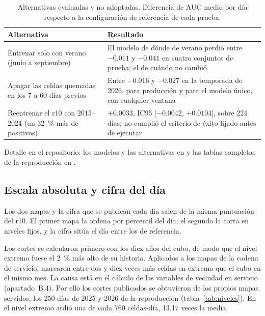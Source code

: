 \documentclass[10pt,a4paper]{article}
\begin{document}
\begin{table}[H]
  \centering
  \caption{Alternativas evaluadas y no adoptadas. Diferencia de AUC medio por
  día respecto a la configuración de referencia de cada prueba.}
  \label{tab:descartes}
  \footnotesize
  \begin{tabular}{@{}>{\raggedright}p{5.2cm}>{\raggedright\arraybackslash}p{11cm}@{}}
    \toprule
    Alternativa & Resultado \\
    \midrule
    Entrenar solo con verano (junio a septiembre) & El modelo de dónde de verano perdió entre $-0.011$ y $-0.041$ en cuatro conjuntos de prueba; el de cuándo no cambió \\
    Apagar las celdas quemadas en los 7 a 60 días previos & Entre $-0.016$ y $-0.027$ en la temporada de 2026, para producción y para el modelo único, con cualquier ventana \\
    Reentrenar el r10 con 2015--2024 (un 32~\% más de positivos) & $+0.0033$, IC95 [$-0.0042$, $+0.0104$], sobre 224 días; no cumplió el criterio de éxito fijado antes de ejecutar \\
    \bottomrule
  \end{tabular}
\end{table}

Detalle en el repositorio: los modelos y las alternativas en
 y las tablas
completas de la reproducción en
.



\subsection{Escala absoluta y cifra del día}
\label{an:b3}

Los dos mapas y la cifra que se publican cada día salen de la misma puntuación
del r10. El primer mapa la ordena por percentil del día; el segundo la corta en
niveles fijos, y la cifra sitúa el día entre los de referencia.

Los cortes se calcularon primero con los diez años del cubo, de modo que el
nivel extremo fuese el 2~\% más alto de su historia. Aplicados a los mapas de
la cadena de servicio, marcaron entre dos y diez veces más celdas en extremo
que el cubo en el mismo mes. La causa está en el cálculo de las variables de
vecindad en servicio (apartado~B.4). Por ello los cortes publicados se
obtuvieron de los propios mapas servidos, los 250 días de 2025 y 2026 de la
reproducción (tabla~\ref{tab:niveles}). En el nivel extremo ardió una de cada
760 celdas-día, 13.17 veces la media.
\end{document}
